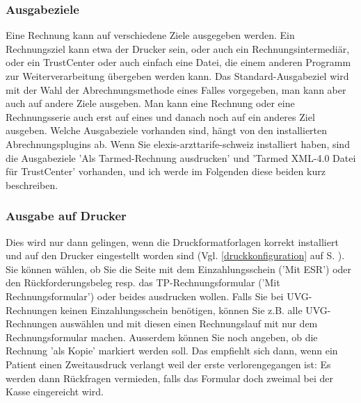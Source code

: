 \documentclass[a4paper]{scrartcl}
\begin{document}
\subsubsection{Ausgabeziele}
Eine Rechnung kann auf verschiedene Ziele ausgegeben werden. Ein Rechnungsziel kann etwa der Drucker sein, oder auch ein Rechnungsintermediär, oder ein TrustCenter oder auch einfach eine Datei, die einem anderen Programm zur Weiterverarbeitung übergeben werden kann. Das Standard-Ausgabeziel wird mit der Wahl der Abrechnungsmethode eines Falles vorgegeben, man kann aber auch auf andere Ziele ausgeben. Man kann eine Rechnung oder eine Rechnungsserie auch erst auf eines und danach noch auf ein anderes Ziel ausgeben. Welche Ausgabeziele vorhanden sind, hängt von den installierten  Abrechnungsplugins ab. Wenn Sie elexis-arzttarife-schweiz installiert haben, sind die Ausgabeziele 'Als Tarmed-Rechnung ausdrucken' und 'Tarmed XML-4.0 Datei für TrustCenter' vorhanden, und ich werde im Folgenden diese beiden kurz beschreiben.

\subsubsection{Ausgabe auf Drucker}
Dies wird nur dann gelingen, wenn die Druckformatforlagen korrekt installiert und auf den Drucker eingestellt worden sind (Vgl. \ref{druckkonfiguration} auf S. \pageref{druckkonfiguration}). Sie können wählen, ob Sie die Seite mit dem Einzahlungsschein ('Mit ESR') oder den Rückforderungsbeleg resp. das TP-Rechnungsformular ('Mit Rechnungsformular') oder beides ausdrucken wollen. Falls Sie bei UVG-Rechnungen keinen Einzahlungsschein benötigen, können Sie z.B. alle UVG-Rechnungen auswählen und mit diesen einen Rechnungslauf mit nur dem Rechnungsformular machen.
Ausserdem können Sie noch angeben, ob die Rechnung 'als Kopie' markiert werden soll. Das empfiehlt sich dann, wenn ein Patient einen Zweitausdruck verlangt weil der erste verlorengegangen ist: Es werden dann Rückfragen vermieden, falls das Formular doch zweimal bei der Kasse eingereicht wird.

\medskip
\end{document}
